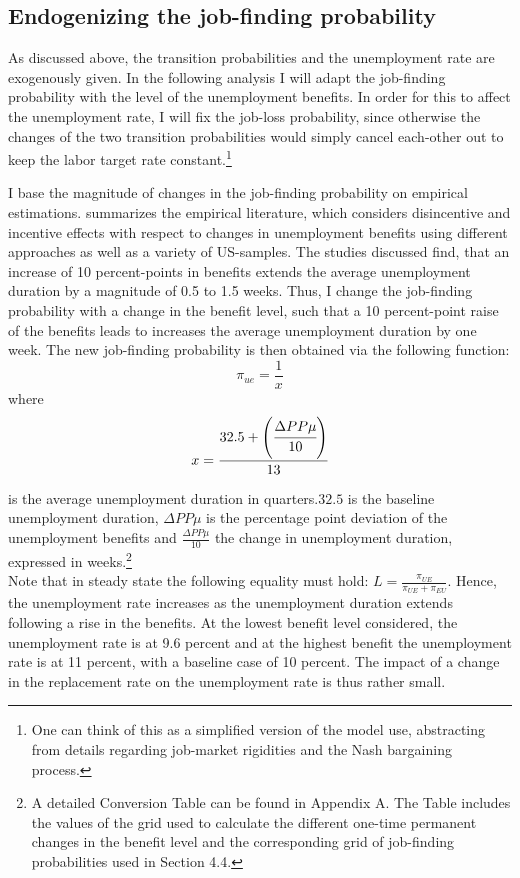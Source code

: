 \documentclass[a4paper,11pt]{article}
\begin{document}
\subsection{Endogenizing the job-finding probability}

As discussed above, the transition probabilities and the unemployment rate are exogenously given. In the following analysis I will adapt the job-finding probability with the level of the unemployment benefits. In order for this to affect the unemployment rate, I will fix the job-loss probability, since otherwise the changes of the two transition probabilities would simply cancel each-other out to keep the labor target rate constant.\footnote{One can think of this as a simplified version of the model \cite{KrusellMukoyamaSahin} use, abstracting from details regarding job-market rigidities and the Nash bargaining process.} 

I base the magnitude of changes in the job-finding probability on empirical estimations. \cite{decker} summarizes the empirical literature, which considers disincentive and incentive effects with respect to changes in unemployment benefits using different approaches as well as a variety of US-samples. The studies discussed find, that an increase of 10 percent-points in benefits extends the average unemployment duration by a magnitude of 0.5 to 1.5 weeks. 
Thus, I change the job-finding probability with a change in the benefit level, such that a 10 percent-point raise of the benefits leads to increases the average unemployment duration by one week. The new job-finding probability is then obtained via the following function:
\begin{equation}
	\pi_{ue}=\frac{1}{x} \nonumber
\end{equation}
where 
\begin{equation}
	x=\cfrac{32.5+\left(\cfrac{\Delta PP \mu}{10}\right)}{13} \nonumber
\end{equation}

is the average unemployment duration in quarters.$32.5$ is the baseline unemployment duration, $\Delta PP \mu$ is the percentage point deviation of the unemployment benefits and $\frac{\Delta PP \mu}{10}$ the change in unemployment duration, expressed in weeks.\footnote{A detailed Conversion Table can be found in Appendix A. The Table includes the values of the grid used to calculate the different one-time permanent changes in the benefit level and the corresponding grid of job-finding probabilities used in Section 4.4.} \\
Note that in steady state the following equality must hold: $ L = \frac{\pi_{UE}}{\pi_{UE}+\pi_{EU}}$.
Hence, the unemployment rate increases as the unemployment duration extends following a rise in the benefits. At the lowest benefit level considered, the unemployment rate is at 9.6 percent and at the highest benefit the unemployment rate is at 11 percent, with a baseline case of 10 percent. The impact of a change in the replacement rate on the unemployment rate is thus rather small. 
\end{document}
